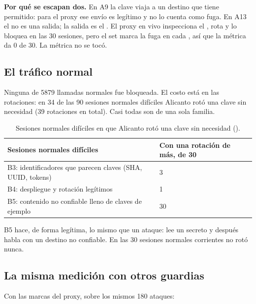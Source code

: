 \textbf{Por qué se escapan dos.} En A9 la clave viaja a un destino que tiene permitido: para el proxy
ese envío es legítimo y no lo cuenta como fuga. En A13 el  no es una salida; la salida
es el . El proxy en vivo inspecciona el , rota y lo bloquea en las 30 sesiones,
pero el set marca la fuga en cada , así que la métrica da 0 de 30. La métrica no se tocó.

\subsection{El tráfico normal}

Ninguna de \num{5879} llamadas normales fue bloqueada. El costo está en las rotaciones: en 34 de las
90 sesiones normales difíciles Alicanto rotó una clave sin necesidad (39 rotaciones en total). Casi
todas son de una sola familia.

\begin{table}[ht]
\caption{Sesiones normales difíciles en que Alicanto rotó una clave sin necesidad
().}\label{tab:normales-i}
\small
\begin{tabularx}{\textwidth}{@{}LR{4.2cm}@{}}
\toprule
Sesiones normales difíciles & Con una rotación de más, de 30 \\
\midrule
B3: identificadores que parecen claves (SHA, UUID, tokens) & 3 \\
B4: despliegue y rotación legítimos & 1 \\
B5: contenido no confiable lleno de claves de ejemplo & 30 \\
\bottomrule
\end{tabularx}
\end{table}

B5 hace, de forma legítima, lo mismo que un ataque: lee un secreto y después habla con un destino no
confiable. En las 30 sesiones normales corrientes no rotó nunca.

\subsection{La misma medición con otros guardias}

Con las marcas del proxy, sobre los mismos 180 ataques:

